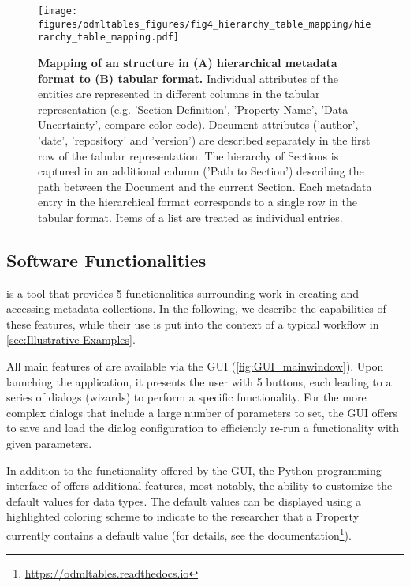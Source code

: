 \begin{figure}[!ht]
\begin{center}
\texttt{[image: figures/odmltables\_figures/fig4\_hierarchy\_table\_mapping/hierarchy\_table\_mapping.pdf]}
\caption[Mapping of an  structure in (A) hierarchical metadata format to (B) tabular format.]{{\label{fig:tree_and_table}
\textbf{Mapping of an  structure in (A) hierarchical metadata format to (B) tabular format.} Individual attributes of the  entities are represented in different columns in the tabular representation (e.g. 'Section Definition', 'Property Name', 'Data Uncertainty', compare color code). Document attributes ('author', 'date', 'repository' and 'version') are described separately in the first row of the tabular representation. The hierarchy of Sections is captured in an additional column ('Path to Section') describing the path between the  Document and the current Section. Each metadata entry in the hierarchical format corresponds to a single row in the tabular format. Items of a list are treated as individual entries.
}}
\end{center}
\end{figure}

\subsection{Software Functionalities}
\label{sec:software_functionalities} 

 is a tool that provides 5 functionalities surrounding work in creating and accessing metadata collections. In the following, we describe the capabilities of these features, while their use is put into the context of a typical workflow in \cref{sec:Illustrative-Examples}.

All main features of  are available via the  GUI (\cref{fig:GUI_mainwindow}). Upon launching the application, it presents the user with 5 buttons, each leading to a series of dialogs (wizards) to perform a specific  functionality. For the more complex dialogs that include a large number of parameters to set, the GUI offers to save and load the dialog configuration to efficiently re-run a functionality with given parameters. 

In addition to the functionality offered by the GUI, the Python programming interface of  offers additional features, most notably, the ability to customize the default values for  data types. The default values can be displayed using a highlighted coloring scheme to indicate to the researcher that a Property currently contains a default value (for details, see the  documentation\footnote{\url{https://odmltables.readthedocs.io}}).

